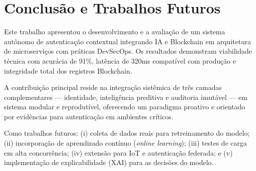 \documentclass[12pt]{article}
\begin{document}
\section{Conclusão e Trabalhos Futuros}

Este trabalho apresentou o desenvolvimento e a avaliação de um sistema autônomo de autenticação contextual integrando IA e Blockchain em arquitetura de microserviços com práticas DevSecOps. Os resultados demonstram viabilidade técnica com acurácia de 91\%, latência de 320ms compatível com produção e integridade total dos registros Blockchain.

A contribuição principal reside na integração sistêmica de três camadas complementares --- identidade, inteligência preditiva e auditoria imutável --- em sistema modular e reprodutível, oferecendo um paradigma proativo e orientado por evidências para autenticação em ambientes críticos.

Como trabalhos futuros: (i) coleta de dados reais para retreinamento do modelo; (ii) incorporação de aprendizado contínuo (\textit{online learning}); (iii) testes de carga em alta concorrência; (iv) extensão para IoT e autenticação federada; e (v) implementação de explicabilidade (XAI) para as decisões do modelo.


\end{document}
